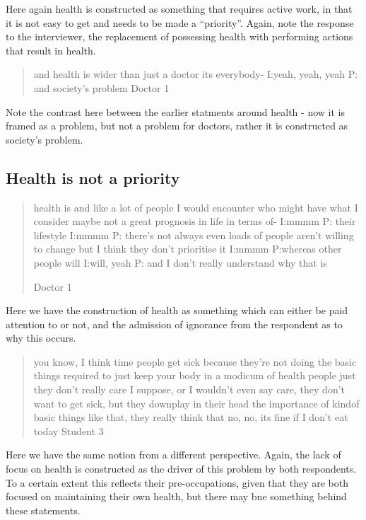 Here again health is constructed as something that requires active work, in that it is not easy to get and needs to be made a ``priority''. Again, note the response to the interviewer, the replacement of possessing health with performing actions that result in health. 


\begin{quotation}
    and health is wider than just a doctor its everybody-
I:yeah, yeah, yeah
P: and society's problem 
Doctor 1
\end{quotation}

Note the contrast here between the earlier statments around health - now it is framed as a problem, but not a problem for doctors, rather it is constructed as society's problem. 


\subsection{Health is not a priority}
\label{sec:health-not-priority}

\begin{quotation}
  health is and like a lot of people I would encounter who might have what I consider maybe not a great prognosis in life in terms of-
I:mmmm
P: their lifestyle 
I:mmmm
P: there's not always even loads of people aren't willing to change but I think they don't prioritise it 
I:mmmm
P:whereas other people will 
I:will, yeah
P: and I don't really understand why that is 

Doctor 1
\end{quotation}
Here we have the construction of health as something which can either be paid attention to or not, and the admission of ignorance from the respondent as to why this occurs. 

\begin{quotation}
  you know, I think time people get sick because they're not doing the basic things required to just keep your body in a modicum of health people just they don't really care I suppose, or I wouldn't even say care, they don't want to get sick, but they downplay in their head the importance of kindof basic things like that, they really think that no, no, its fine if I don't eat today
Student 3
\end{quotation}


Here we have the same notion from a different perspective. Again, the lack of focus on health is constructed as the driver of this problem by both respondents. To a certain extent this reflects their pre-occupations, given that they are both focused on maintaining their own health, but there may bne something behind these statements. 

